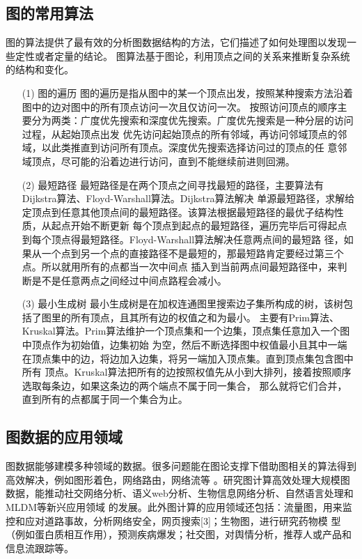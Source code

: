 \documentclass[master]{thesis-uestc}
\begin{document}
\subsection{图的常用算法}
    图的算法提供了最有效的分析图数据结构的方法，它们描述了如何处理图以发现一些定性或者定量的结论。
图算法基于图论，利用顶点之间的关系来推断复杂系统的结构和变化。
\begin{enumerate}
    \item[(1)] 图的遍历
    图的遍历是指从图中的某一个顶点出发，按照某种搜索方法沿着图中的边对图中的所有顶点访问一次且仅访问一次。
按照访问顶点的顺序主要分为两类：广度优先搜索和深度优先搜索。广度优先搜索是一种分层的访问过程，从起始顶点出发
优先访问起始顶点的所有邻域，再访问邻域顶点的邻域，以此类推直到访问所有顶点。深度优先搜索选择访问过的顶点的任
意邻域顶点，尽可能的沿着边进行访问，直到不能继续前进则回溯。
    
    \item[(2)] 最短路径
    最短路径是在两个顶点之间寻找最短的路径，主要算法有Dijkstra算法、Floyd-Warshall算法。Dijkstra算法解决
单源最短路径，求解给定顶点到任意其他顶点间的最短路径。该算法根据最短路径的最优子结构性质，从起点开始不断更新
每个顶点到起点的最短路径，遍历完毕后可得起点到每个顶点得最短路径。Floyd-Warshall算法解决任意两点间的最短路
径，如果从一个点到另一个点的直接路径不是最短的，那最短路肯定要经过第三个点。所以就用所有的点都当一次中间点
插入到当前两点间最短路径中，来判断是不是任意两点之间经过中间点路程会减小。

    \item[(3)] 最小生成树
    最小生成树是在加权连通图里搜索边子集所构成的树，该树包括了图里的所有顶点，且其所有边的权值之和为最小。
主要有Prim算法、Kruskal算法。Prim算法维护一个顶点集和一个边集，顶点集任意加入一个图中顶点作为初始值，边集初始
为空，然后不断选择图中权值最小且其中一端在顶点集中的边，将边加入边集，将另一端加入顶点集。直到顶点集包含图中所有
顶点。Kruskal算法把所有的边按照权值先从小到大排列，接着按照顺序选取每条边，如果这条边的两个端点不属于同一集合，
那么就将它们合并，直到所有的点都属于同一个集合为止。

\end{enumerate}

\subsection{图数据的应用领域}
\label{subsec:graph-app}


    图数据能够建模多种领域的数据。很多问题能在图论支撑下借助图相关的算法得到高效解决，例如图形着色，网络路由，网络流等
。研究图计算高效处理大规模图数据，能推动社交网络分析、语义web分析、生物信息网络分析、自然语言处理和MLDM等新兴应用领域
的发展。此外图计算的应用领域还包括：流量图，用来监控和应对道路事故，分析网络安全，网页搜索[3]；生物图，进行研究药物模
型（例如蛋白质相互作用），预测疾病爆发；社交图，对舆情分析，推荐人或产品和信息流跟踪等。
\end{document}
